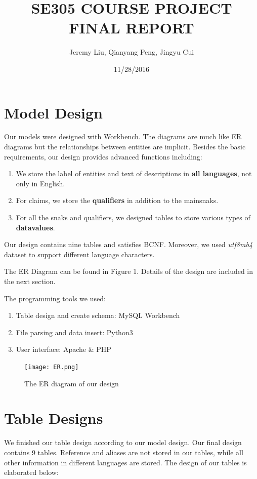 \documentclass[12pt]{article}
\title{SE305 COURSE PROJECT FINAL REPORT}
\author{Jeremy Liu, Qianyang Peng, Jingyu Cui}
\date{11/28/2016}
\begin{document}
\maketitle
\tableofcontents
\newpage
{}


\section{Model Design}

Our models were designed with Workbench. The diagrams are much like ER diagrams but the relationships between entities are implicit. Besides the basic requirements, our design provides advanced functions including:
\begin{enumerate}
	\item We store the label of entities and text of descriptions in \textbf{all languages}, not only in English.
	\item For claims, we store the \textbf{qualifiers} in addition to the mainsnaks.
	\item For all the snaks and qualifiers, we designed tables to store various types of \textbf{datavalues}.
\end{enumerate}

Our design contains nine tables and satisfies BCNF. Moreover, we used \emph{utf8mb4} dataset to support different language characters.

The ER Diagram can be found in Figure 1. Details of the design are included in the next section.

The programming tools we used:
\begin{enumerate}
	\item Table design and create schema: MySQL Workbench
	\item File parsing and data insert: Python3
	\item User interface: Apache \& PHP
\end{enumerate}
\begin{figure}
\label{ER DIAGRAM}
\centering
\texttt{[image: ER.png]}
\caption{The ER diagram of our design}
\end{figure}
\section{Table Designs}
We finished our table design according to our model design. Our final design contains 9 tables. Reference and aliases are not stored in our tables, while all other information in different languages are stored. The design of our tables is elaborated below:
\end{document}
